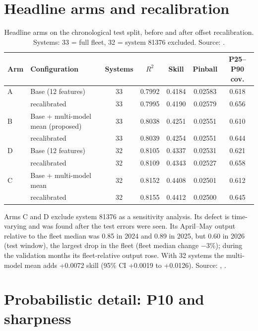 \section{Headline arms and recalibration}
\label{sec:s-arms}

\begin{table}[H]
\centering
\caption{Headline arms on the chronological test split, before and after offset recalibration. Systems: 33 = full fleet, 32 = system 81376 excluded. Source: .}
\label{tab:s-arms}
\small
\begin{tabularx}{\textwidth}{@{}l X c c c c c@{}}
\toprule
Arm & Configuration & Systems & $R^2$ & Skill & Pinball & P25--P90 cov. \\
\midrule
A & Base (12 features) & 33 & 0.7992 & 0.4184 & 0.02583 & 0.618 \\
  & \quad recalibrated & 33 & 0.7995 & 0.4190 & 0.02579 & 0.656 \\
B & Base + multi-model mean (proposed) & 33 & 0.8038 & 0.4251 & 0.02551 & 0.610 \\
  & \quad recalibrated & 33 & 0.8039 & 0.4254 & 0.02551 & 0.644 \\
D & Base (12 features) & 32 & 0.8105 & 0.4337 & 0.02531 & 0.621 \\
  & \quad recalibrated & 32 & 0.8109 & 0.4343 & 0.02527 & 0.658 \\
C & Base + multi-model mean & 32 & 0.8152 & 0.4408 & 0.02501 & 0.612 \\
  & \quad recalibrated & 32 & 0.8155 & 0.4412 & 0.02500 & 0.645 \\
\bottomrule
\end{tabularx}
\end{table}

Arms C and D exclude system 81376 as a sensitivity analysis. Its defect is time-varying and was found after the test errors were seen. Its April--May output relative to the fleet median was 0.85 in 2024 and 0.89 in 2025, but 0.60 in 2026 (test window), the largest drop in the fleet (fleet median change $-3\%$); during the validation months its fleet-relative output rose. With 32 systems the multi-model mean adds +0.0072 skill (95\% CI +0.0019 to +0.0126). Source: , .

\section{Probabilistic detail: P10 and sharpness}
\label{sec:s-p10}

